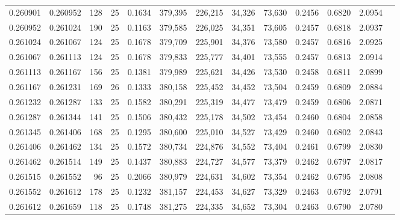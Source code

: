 \begin{tabular}{rrrrrrrrrrrrr}
0.260901 & 0.260952 &   128 &  25 &                                     0.1634 & 379,395 & 226,215 &  34,326 &  73,630 & 0.2456 & 0.6820 & 2.0954 \\
0.260952 & 0.261024 &   190 &  25 &                                     0.1163 & 379,585 & 226,025 &  34,351 &  73,605 & 0.2457 & 0.6818 & 2.0937 \\
0.261024 & 0.261067 &   124 &  25 &                                     0.1678 & 379,709 & 225,901 &  34,376 &  73,580 & 0.2457 & 0.6816 & 2.0925 \\
0.261067 & 0.261113 &   124 &  25 &                                     0.1678 & 379,833 & 225,777 &  34,401 &  73,555 & 0.2457 & 0.6813 & 2.0914 \\
0.261113 & 0.261167 &   156 &  25 &                                     0.1381 & 379,989 & 225,621 &  34,426 &  73,530 & 0.2458 & 0.6811 & 2.0899 \\
0.261167 & 0.261231 &   169 &  26 &                                     0.1333 & 380,158 & 225,452 &  34,452 &  73,504 & 0.2459 & 0.6809 & 2.0884 \\
0.261232 & 0.261287 &   133 &  25 &                                     0.1582 & 380,291 & 225,319 &  34,477 &  73,479 & 0.2459 & 0.6806 & 2.0871 \\
0.261287 & 0.261344 &   141 &  25 &                                     0.1506 & 380,432 & 225,178 &  34,502 &  73,454 & 0.2460 & 0.6804 & 2.0858 \\
0.261345 & 0.261406 &   168 &  25 &                                     0.1295 & 380,600 & 225,010 &  34,527 &  73,429 & 0.2460 & 0.6802 & 2.0843 \\
0.261406 & 0.261462 &   134 &  25 &                                     0.1572 & 380,734 & 224,876 &  34,552 &  73,404 & 0.2461 & 0.6799 & 2.0830 \\
0.261462 & 0.261514 &   149 &  25 &                                     0.1437 & 380,883 & 224,727 &  34,577 &  73,379 & 0.2462 & 0.6797 & 2.0817 \\
0.261515 & 0.261552 &    96 &  25 &                                     0.2066 & 380,979 & 224,631 &  34,602 &  73,354 & 0.2462 & 0.6795 & 2.0808 \\
0.261552 & 0.261612 &   178 &  25 &                                     0.1232 & 381,157 & 224,453 &  34,627 &  73,329 & 0.2463 & 0.6792 & 2.0791 \\
0.261612 & 0.261659 &   118 &  25 &                                     0.1748 & 381,275 & 224,335 &  34,652 &  73,304 & 0.2463 & 0.6790 & 2.0780 \\

\end{tabular}
